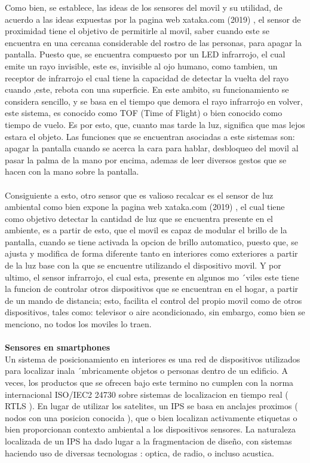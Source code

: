 \documentclass[conference,compsoc,onecolumn]{IEEEtran}
\begin{document}
Como  bien,  se  establece,  las  ideas  de  los  sensores  del  movil  y  su  utilidad,  de  acuerdo  a  las  ideas  expuestas  por la pagina web xataka.com (2019) , el sensor de proximidad tiene el objetivo de permitirle al movil, saber cuando este se encuentra en una cercanıa considerable del rostro de las personas, para apagar la pantalla. Puesto que, se encuentra compuesto por un LED infrarrojo, el cual emite un rayo invisible, este es, invisible al ojo humano, como tambien, un receptor de infrarrojo el cual tiene la capacidad de detectar la vuelta del rayo cuando ,este, rebota con una superficie. En este ambito, su funcionamiento se considera sencillo, y se basa en el tiempo que demora el rayo infrarrojo en volver, este sistema, es conocido como TOF (Time of Flight) o bien conocido como tiempo de vuelo. Es por esto, que, cuanto mas tarde la luz, significa que mas lejos estara el objeto. Las funciones que se encuentran asociadas a este sistemas son: apagar la pantalla cuando se acerca la cara para hablar, desbloqueo del movil al pasar la palma de la mano por encima, ademas de leer diversos gestos que se hacen con la mano sobre la pantalla. 
\\
\\
Consiguiente a esto, otro sensor que es valioso recalcar es el sensor de luz ambiental como bien expone la pagina web xataka.com (2019) , el cual tiene como objetivo detectar la cantidad de luz que se encuentra presente en el ambiente, es a partir de esto, que el movil es capaz de modular el brillo de la pantalla, cuando se tiene activada la opcion de brillo automatico, puesto que, se ajusta y modifica de forma diferente tanto en interiores como exteriores a partir de la luz base con la que se encuentre utilizando el dispositivo movil. Y por ultimo, el sensor infrarrojo, el cual esta, presente en algunos mo ´viles este tiene la funcion de controlar otros dispositivos que se encuentran en el hogar, a partir de un mando de distancia; esto, facilita el control del propio movil como de otros dispositivos, tales como: televisor o aire acondicionado, sin embargo, como bien se menciono, no todos los moviles lo traen.
\\
\\
\textbf{Sensores  en  smartphones }\\Un sistema de posicionamiento en interiores es una red de dispositivos utilizados para localizar  inala ´mbricamente  objetos  o  personas  dentro  de  un  edificio.   A  veces,  los  productos  que  se  ofrecen  bajo este termino no cumplen con la norma internacional ISO/IEC2 24730 sobre sistemas de localizacion en tiempo real ( RTLS ). En lugar de utilizar los satelites, un IPS se basa en anclajes proximos ( nodos con una posicion conocida ), que o bien localizan activamente etiquetas o bien proporcionan contexto ambiental a los dispositivos sensores. La naturaleza localizada de un IPS ha dado lugar a la fragmentacion de diseño, con sistemas haciendo uso de diversas tecnologıas : optica, de radio, o incluso acustica. 
\end{document}
